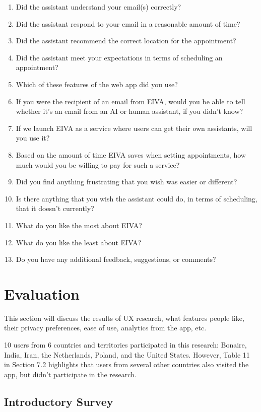 \documentclass{article}
\begin{document}
\begin{enumerate}
	\item Did the assistant understand your email(s) correctly?
	\item Did the assistant respond to your email in a reasonable amount of time?
	\item Did the assistant recommend the correct location for the appointment?
	\item Did the assistant meet your expectations in terms of scheduling an appointment?
	\item Which of these features of the web app did you use?
	\item If you were the recipient of an email from EIVA, would you be able to tell whether it's an email from an AI or human assistant, if you didn't know?
	\item If we launch EIVA as a service where users can get their own assistants, will you use it?
	\item Based on the amount of time EIVA saves when setting appointments, how much would you be willing to pay for such a service?
	\item Did you find anything frustrating that you wish was easier or different?
	\item Is there anything that you wish the assistant could do, in terms of scheduling, that it doesn't currently?
	\item What do you like the most about EIVA?
	\item What do you like the least about EIVA?
	\item Do you have any additional feedback, suggestions, or comments?
\end{enumerate}

\newpage

\section{Evaluation}

This section will discuss the results of UX research, what features people like, their privacy preferences, ease of use, analytics from the app, etc.

10 users from 6 countries and territories participated in this research: Bonaire, India, Iran, the Netherlands, Poland, and the United States. However, Table 11 in Section 7.2 highlights that users from several other countries also visited the app, but didn't participate in the research.

\subsection{Introductory Survey}
\end{document}
